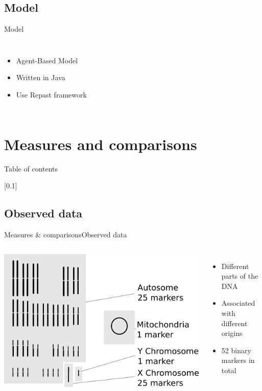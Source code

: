 \documentclass[10pt, aspectratio=43]{beamer}
\begin{document}
\subsection{Model}
\begin{frame}{}{Model}
\begin{columns}

  \begin{itemize}
    \item Agent-Based Model
    \item Written in Java
    \item Use Repast framework
  \end{itemize}

\end{columns}
\end{frame}


\section{Measures and comparisons}
\begin{frame}{}{Table of contents}
\tableofcontents[currentsection, subsectionstyle=show/show/hide]
\end{frame}

[0.1]{}{}{}
\subsection{Observed data}
\begin{frame}{Measures \& comparisons}{Observed data}
\begin{columns}
  \includegraphics[width=1\textwidth]{../data/markers.png}

  \begin{itemize}
    \item Different parts of the DNA
    \item Associated with different origins
    \item 52 binary markers in total
  \end{itemize}

\end{columns}
\end{frame}
\end{document}
